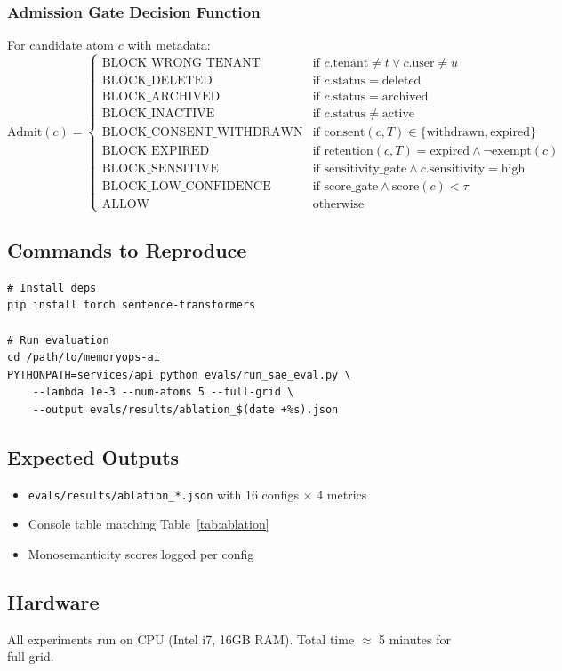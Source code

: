 \documentclass[11pt]{article}
\begin{document}
\subsubsection{Admission Gate Decision Function}
For candidate atom $c$ with metadata:
\begin{equation}
\text{Admit}(c) = 
\begin{cases}
\text{BLOCK\_WRONG\_TENANT} & \text{if } c.\text{tenant} \neq t \lor c.\text{user} \neq u \\
\text{BLOCK\_DELETED} & \text{if } c.\text{status} = \text{deleted} \\
\text{BLOCK\_ARCHIVED} & \text{if } c.\text{status} = \text{archived} \\
\text{BLOCK\_INACTIVE} & \text{if } c.\text{status} \neq \text{active} \\
\text{BLOCK\_CONSENT\_WITHDRAWN} & \text{if } \text{consent}(c, T) \in \{\text{withdrawn}, \text{expired}\} \\
\text{BLOCK\_EXPIRED} & \text{if } \text{retention}(c, T) = \text{expired} \land \neg\text{exempt}(c) \\
\text{BLOCK\_SENSITIVE} & \text{if } \text{sensitivity\_gate} \land c.\text{sensitivity} = \text{high} \\
\text{BLOCK\_LOW\_CONFIDENCE} & \text{if } \text{score\_gate} \land \text{score}(c) < \tau \\
\text{ALLOW} & \text{otherwise}
\end{cases}
\end{equation}

\subsection{Commands to Reproduce}
\begin{verbatim}
# Install deps
pip install torch sentence-transformers

# Run evaluation
cd /path/to/memoryops-ai
PYTHONPATH=services/api python evals/run_sae_eval.py \
    --lambda 1e-3 --num-atoms 5 --full-grid \
    --output evals/results/ablation_$(date +%s).json
\end{verbatim}

\subsection{Expected Outputs}
\begin{itemize}
  \item \texttt{evals/results/ablation\_*.json} with 16 configs $\times$ 4 metrics
  \item Console table matching Table~\ref{tab:ablation}
  \item Monosemanticity scores logged per config
\end{itemize}

\subsection{Hardware}
All experiments run on CPU (Intel i7, 16GB RAM). Total time $\approx$ 5 minutes for full grid.
\end{document}
